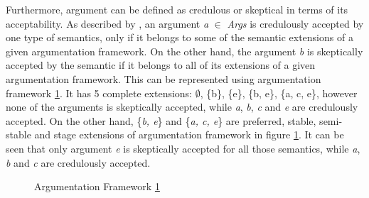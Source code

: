 Furthermore, argument can be defined as credulous or skeptical in terms of its acceptability. As described by \citet{arieli2015conflict}, an argument \textit{a} $\in$ \textit{Args} is credulously accepted by one type of semantics, only if it belongs to some of the semantic extensions of a given argumentation framework. On the other hand, the argument \textit{b} is skeptically accepted by the semantic if it belongs to all of its extensions of a given argumentation framework. This can be represented using argumentation framework \ref{fig:af5}. It has 5 complete extensions: $\emptyset$, \{b\}, \{e\}, \{b, e\}, \{a, c, e\}, however none of the arguments is skeptically accepted, while \textit{a}, \textit{b}, \textit{c} and \textit{e} are credulously accepted. On the other hand, \{\textit{b, e}\} and \{\textit{a, c, e}\} are preferred, stable, semi-stable and stage extensions of argumentation framework in figure \ref{fig:af5}. It can be seen that only argument \textit{e} is skeptically accepted for all those semantics, while \textit{a}, \textit{b} and \textit{c} are credulously accepted.

\begin{figure}[h]
\centering
{}
\caption{Argumentation Framework \ref{fig:af5}}
\label{fig:af5}
\end{figure}